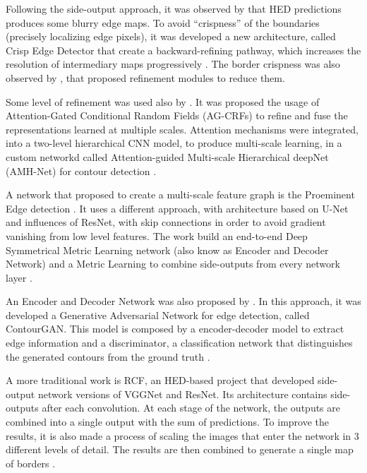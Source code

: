 Following the side-output approach, it was observed by \cite{Wang:2017} that HED predictions produces some blurry edge maps.
To avoid ``crispness'' of the boundaries (precisely localizing edge pixels), it was developed a new architecture, called Crisp Edge Detector that create a backward-refining pathway, which increases the resolution of intermediary maps progressively \cite{Wang:2017}. 
The border crispness was also observed by \cite{CrispBoundaries:2018:Deng2018570}, that proposed refinement modules to reduce them.

Some level of refinement was used also by \cite{DeepStructured:2017:Xu20173962}.
It was proposed the usage of Attention-Gated Conditional Random Fields (AG-CRFs) to refine and fuse the representations learned at multiple scales.
Attention mechanisms were integrated, into a two-level hierarchical CNN model, to produce multi-scale learning, in a custom networkd called Attention-guided Multi-scale Hierarchical deepNet (AMH-Net) for contour detection  \cite{DeepStructured:2017:Xu20173962}. 

A network that proposed to create a multi-scale feature graph is the Proeminent Edge detection \cite{ProeminentEdge:2018:Cai2018}.
It uses a different approach, with architecture based on U-Net \cite{Unet:2015} and influences of ResNet, with skip connections in order to avoid gradient vanishing from low level features.
The work build an end-to-end Deep Symmetrical Metric Learning network (also know as Encoder and Decoder Network) and a Metric Learning to combine side-outputs from every network layer \cite{ProeminentEdge:2018:Cai2018}.

An Encoder and Decoder Network was also proposed by \cite{Yang:2019}.
In this approach, it was developed a Generative Adversarial Network for edge detection, called ContourGAN.
This model is composed by a encoder-decoder model to extract edge information and a discriminator, a classification network that distinguishes the generated contours from the ground truth \cite{Yang:2019}.

A more traditional work is RCF, an HED-based project that developed side-output network versions of VGGNet and ResNet.
Its architecture contains side-outputs after each convolution.
At each stage of the network, the outputs are combined into a single output with the sum of predictions.
To improve the results, it is also made a process of scaling the images that enter the network in 3 different levels of detail.
The results are then combined to generate a single map of borders \cite{RCF:2019}.

